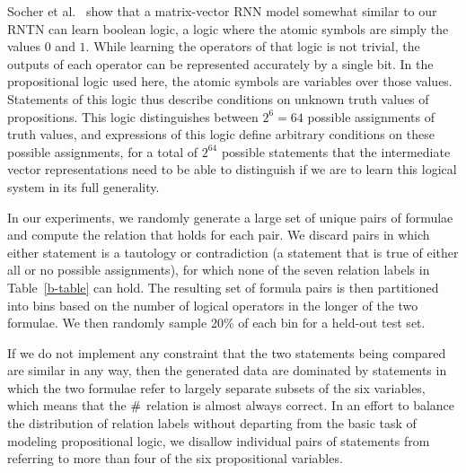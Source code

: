 Socher et al.~ show that a matrix-vector RNN
model somewhat similar to our RNTN can learn boolean logic, 
a logic where the atomic symbols are simply the
values $0$ and $1$. While learning the operators of that logic is not trivial, the outputs of
each operator can be represented accurately by a single bit.
In the propositional logic used here, the atomic symbols are variables over those values. 
Statements of this logic thus describe conditions on
unknown truth values of propositions. This logic distinguishes
between $2^{6} = 64$ possible assignments of truth values, and
expressions of this logic define arbitrary conditions on these
possible assignments, for a total of $2^{64}$ %
possible statements that the intermediate vector representations need
to be able to distinguish if we are to learn this logical system in its
full generality.

In our experiments, we randomly generate a large set of unique pairs 
of formulae and compute the relation that holds for each pair.
We discard pairs in which either statement is a tautology or
contradiction (a statement that is true of either all or no possible
assignments), for which none of the seven relation labels in
Table~\ref{b-table} can hold. The resulting set of formula pairs is
then partitioned into bins based on the number of logical operators in
the longer of the two formulae. We then randomly sample 20\% of each
bin for a held-out test set.

If we do not implement any constraint that the two statements being
compared are similar in any way, then the generated data are dominated
by statements in which the two formulae refer to largely separate
subsets of the six variables, which means that the $\mathbin{\#}$ relation
is almost always correct.  In an effort to balance the distribution of
relation labels without departing from the basic task of modeling
propositional logic, we disallow individual pairs of statements from
referring to more than four of the six propositional variables.

